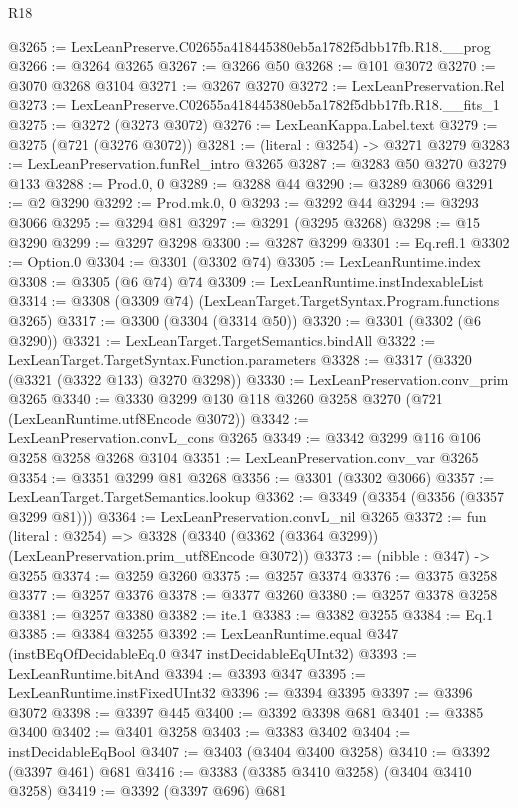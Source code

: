 \begin{lexlean}{R18}
\begin{coremodule}
@3265 := LexLeanPreserve.C02655a418445380eb5a1782f5dbb17fb.R18.__prog
@3266 := @3264 @3265
@3267 := @3266 @50
@3268 := @101 @3072
@3270 := @3070 @3268 @3104
@3271 := @3267 @3270
@3272 := LexLeanPreservation.Rel
@3273 := LexLeanPreserve.C02655a418445380eb5a1782f5dbb17fb.R18.__fits_1
@3275 := @3272 (@3273 @3072)
@3276 := LexLeanKappa.Label.text
@3279 := @3275 (@721 (@3276 @3072))
@3281 := (literal : @3254) -> @3271 @3279
@3283 := LexLeanPreservation.funRel_intro @3265
@3287 := @3283 @50 @3270 @3279 @133
@3288 := Prod.{0, 0}
@3289 := @3288 @44
@3290 := @3289 @3066
@3291 := @2 @3290
@3292 := Prod.mk.{0, 0}
@3293 := @3292 @44
@3294 := @3293 @3066
@3295 := @3294 @81
@3297 := @3291 (@3295 @3268)
@3298 := @15 @3290
@3299 := @3297 @3298
@3300 := @3287 @3299
@3301 := Eq.refl.{1}
@3302 := Option.{0}
@3304 := @3301 (@3302 @74)
@3305 := LexLeanRuntime.index
@3308 := @3305 (@6 @74) @74
@3309 := LexLeanRuntime.instIndexableList
@3314 := @3308 (@3309 @74) (LexLeanTarget.TargetSyntax.Program.functions @3265)
@3317 := @3300 (@3304 (@3314 @50))
@3320 := @3301 (@3302 (@6 @3290))
@3321 := LexLeanTarget.TargetSemantics.bindAll
@3322 := LexLeanTarget.TargetSyntax.Function.parameters
@3328 := @3317 (@3320 (@3321 (@3322 @133) @3270 @3298))
@3330 := LexLeanPreservation.conv_prim @3265
@3340 := @3330 @3299 @130 @118 @3260 @3258 @3270 (@721 (LexLeanRuntime.utf8Encode @3072))
@3342 := LexLeanPreservation.convL_cons @3265
@3349 := @3342 @3299 @116 @106 @3258 @3258 @3268 @3104
@3351 := LexLeanPreservation.conv_var @3265
@3354 := @3351 @3299 @81 @3268
@3356 := @3301 (@3302 @3066)
@3357 := LexLeanTarget.TargetSemantics.lookup
@3362 := @3349 (@3354 (@3356 (@3357 @3299 @81)))
@3364 := LexLeanPreservation.convL_nil @3265
@3372 := fun (literal : @3254) =>
  @3328 (@3340 (@3362 (@3364 @3299)) (LexLeanPreservation.prim_utf8Encode @3072))
@3373 := (nibble : @347) -> @3255
@3374 := @3259 @3260
@3375 := @3257 @3374
@3376 := @3375 @3258
@3377 := @3257 @3376
@3378 := @3377 @3260
@3380 := @3257 @3378 @3258
@3381 := @3257 @3380
@3382 := ite.{1}
@3383 := @3382 @3255
@3384 := Eq.{1}
@3385 := @3384 @3255
@3392 := LexLeanRuntime.equal @347 (instBEqOfDecidableEq.{0} @347 instDecidableEqUInt32)
@3393 := LexLeanRuntime.bitAnd
@3394 := @3393 @347
@3395 := LexLeanRuntime.instFixedUInt32
@3396 := @3394 @3395
@3397 := @3396 @3072
@3398 := @3397 @445
@3400 := @3392 @3398 @681
@3401 := @3385 @3400
@3402 := @3401 @3258
@3403 := @3383 @3402
@3404 := instDecidableEqBool
@3407 := @3403 (@3404 @3400 @3258)
@3410 := @3392 (@3397 @461) @681
@3416 := @3383 (@3385 @3410 @3258) (@3404 @3410 @3258)
@3419 := @3392 (@3397 @696) @681

\end{coremodule}
\end{lexlean}
